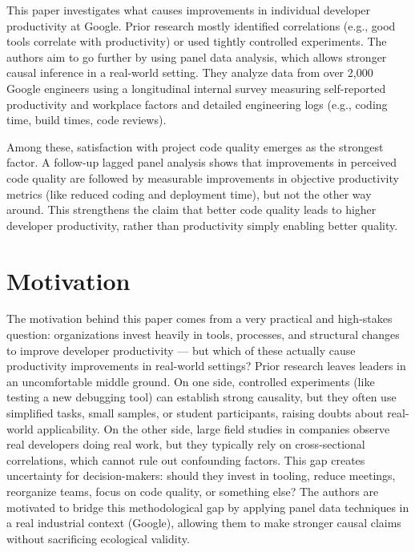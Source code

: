This paper investigates what causes improvements in individual developer productivity at Google. Prior research mostly identified correlations (e.g., good tools correlate with productivity) or used tightly controlled experiments. The authors aim to go further by using panel data analysis, which allows stronger causal inference in a real-world setting. They analyze data from over 2,000 Google engineers using a longitudinal internal survey measuring self-reported productivity and workplace factors and detailed engineering logs (e.g., coding time, build times, code reviews).

Among these, satisfaction with project code quality emerges as the strongest factor. A follow-up lagged panel analysis shows that improvements in perceived code quality are followed by measurable improvements in objective productivity metrics (like reduced coding and deployment time), but not the other way around. This strengthens the claim that better code quality leads to higher developer productivity, rather than productivity simply enabling better quality.

\section{Motivation}
The motivation behind this paper comes from a very practical and high-stakes question: organizations invest heavily in tools, processes, and structural changes to improve developer productivity — but which of these actually cause productivity improvements in real-world settings? Prior research leaves leaders in an uncomfortable middle ground. On one side, controlled experiments (like testing a new debugging tool) can establish strong causality, but they often use simplified tasks, small samples, or student participants, raising doubts about real-world applicability. On the other side, large field studies in companies observe real developers doing real work, but they typically rely on cross-sectional correlations, which cannot rule out confounding factors. This gap creates uncertainty for decision-makers: should they invest in tooling, reduce meetings, reorganize teams, focus on code quality, or something else? The authors are motivated to bridge this methodological gap by applying panel data techniques in a real industrial context (Google), allowing them to make stronger causal claims without sacrificing ecological validity.

